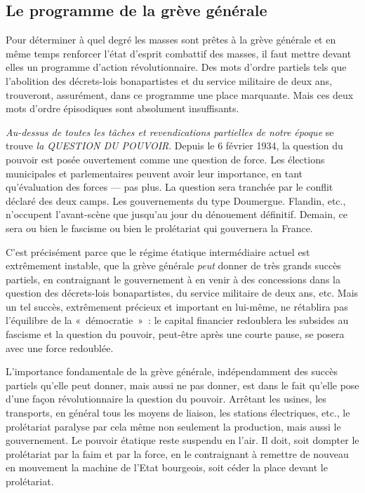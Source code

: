 \documentclass[french,twoside]{book} %
\begin{document}
\subsection[{Le programme de la grève générale}]{Le programme de la grève générale}
\noindent Pour déterminer à quel degré les masses sont prêtes à la grève générale et en même temps renforcer l’état d’esprit combattif des masses, il faut mettre devant elles un programme d’action révolutionnaire. Des mots d’ordre partiels tels que l’abolition des décrets-lois bonapartistes et du service militaire de deux ans, trouveront, assurément, dans ce programme une place marquante. Mais ces deux mots d’ordre épisodiques sont absolument insuffisants.\par
\emph{Au-dessus de toutes les tâches et revendications partielles de notre époque} se trouve \emph{la QUESTION DU POUVOIR}. Depuis le 6 février 1934, la question du pouvoir est posée ouvertement comme une question de force. Les élections municipales et parlementaires peuvent avoir leur importance, en tant qu’évaluation des forces — pas plus. La question sera tranchée par le conflit déclaré des deux camps. Les gouvernements du type Doumergue. Flandin, etc., n’occupent l’avant-scène que jusqu’au jour du dénouement définitif. Demain, ce sera ou bien le fascisme ou bien le prolétariat qui gouvernera la France.\par
 C’est précisément parce que le régime étatique intermédiaire actuel est extrêmement instable, que la grève générale \emph{peut} donner de très grands succès partiels, en contraignant le gouvernement à en venir à des concessions dans la question des décrets-lois bonapartistes, du service militaire de deux ans, etc. Mais un tel succès, extrêmement précieux et important en lui-même, ne rétablira pas l’équilibre de la « démocratie » : le capital financier redoublera les subsides au fascisme et la question du pouvoir, peut-être après une courte pause, se posera avec une force redoublée.\par
L’importance fondamentale de la grève générale, indépendamment des succès partiels qu’elle peut donner, mais aussi ne pas donner, est dans le fait qu’elle pose d’une façon révolutionnaire la question du pouvoir. Arrêtant les usines, les transports, en général tous les moyens de liaison, les stations électriques, etc., le prolétariat paralyse par cela même non seulement la production, mais aussi le gouvernement. Le pouvoir étatique reste suspendu en l’air. Il doit, soit dompter le prolétariat par la faim et par la force, en le contraignant à remettre de nouveau en mouvement la machine de l’Etat bourgeois, soit céder la place devant le prolétariat.\par
\end{document}
